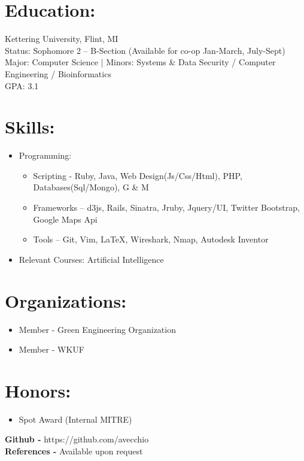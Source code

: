 \documentclass{res}
\begin{document}
\section{Education:}
Kettering University, Flint, MI\\
Status: Sophomore 2 – B-Section (Available for co-op Jan-March, July-Sept)\\
Major: Computer Science %
|   Minors: Systems \& Data Security / Computer Engineering / Bioinformatics\\
GPA: 3.1
\section{Skills:}
\begin{itemize}
\item Programming:
\begin{itemize}[label=$\circ$]
\item Scripting - Ruby, Java, Web Design(Js/Css/Html), PHP, Databases(Sql/Mongo), G \& M
\item Frameworks – d3js, Rails, Sinatra, Jruby, Jquery/UI, Twitter Bootstrap, Google Maps Api
\item Tools – Git, Vim, \LaTeX, Wireshark, Nmap, Autodesk Inventor %
\end{itemize}
\item Relevant Courses: Artificial Intelligence
\end{itemize}
\section{Organizations:}
\begin{itemize}
\item Member - Green Engineering Organization
\item Member - WKUF
\end{itemize}

\section{Honors:}
\begin{itemize}
\item Spot Award (Internal MITRE)
\end{itemize}

\begin{center}
\textbf{Github - }https://github.com/avecchio\\
\textbf{References - }Available upon request
\end{center}
\end{document}
